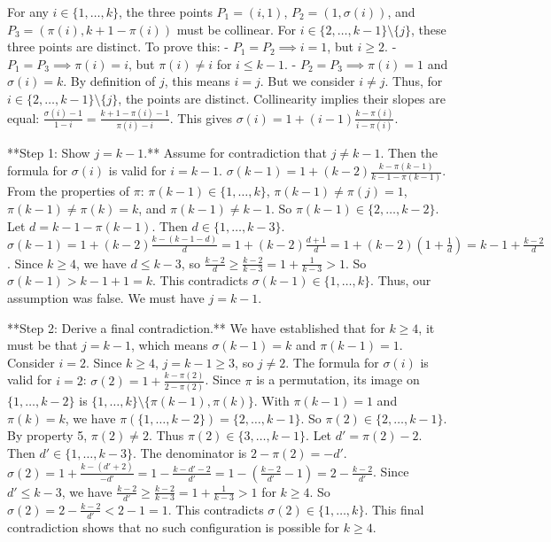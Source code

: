     For any $i \in \{1, \dots, k\}$, the three points $P_1=(i,1)$, $P_2=(1, \sigma(i))$, and $P_3=(\pi(i), k+1-\pi(i))$ must be collinear. For $i \in \{2, \dots, k-1\} \setminus \{j\}$, these three points are distinct. To prove this:
    - $P_1=P_2 \implies i=1$, but $i \ge 2$.
    - $P_1=P_3 \implies \pi(i)=i$, but $\pi(i) \ne i$ for $i \le k-1$.
    - $P_2=P_3 \implies \pi(i)=1$ and $\sigma(i)=k$. By definition of $j$, this means $i=j$. But we consider $i \ne j$.
    Thus, for $i \in \{2, \dots, k-1\} \setminus \{j\}$, the points are distinct. Collinearity implies their slopes are equal: $\frac{\sigma(i)-1}{1-i} = \frac{k+1-\pi(i)-1}{\pi(i)-i}$. This gives $\sigma(i) = 1 + (i-1)\frac{k-\pi(i)}{i-\pi(i)}$.

    **Step 1: Show $j=k-1$.**
    Assume for contradiction that $j \ne k-1$. Then the formula for $\sigma(i)$ is valid for $i=k-1$.
    $\sigma(k-1) = 1 + (k-2)\frac{k-\pi(k-1)}{k-1-\pi(k-1)}$.
    From the properties of $\pi$: $\pi(k-1) \in \{1, \dots, k\}$, $\pi(k-1) \ne \pi(j)=1$, $\pi(k-1) \ne \pi(k)=k$, and $\pi(k-1) \ne k-1$. So $\pi(k-1) \in \{2, \dots, k-2\}$.
    Let $d = k-1-\pi(k-1)$. Then $d \in \{1, \dots, k-3\}$.
    $\sigma(k-1) = 1 + (k-2)\frac{k-(k-1-d)}{d} = 1 + (k-2)\frac{d+1}{d} = 1+(k-2)(1+\frac{1}{d}) = k-1 + \frac{k-2}{d}$.
    Since $k \ge 4$, we have $d \le k-3$, so $\frac{k-2}{d} \ge \frac{k-2}{k-3} = 1+\frac{1}{k-3} > 1$.
    So $\sigma(k-1) > k-1+1=k$. This contradicts $\sigma(k-1) \in \{1, \dots, k\}$.
    Thus, our assumption was false. We must have $j=k-1$.

    **Step 2: Derive a final contradiction.**
    We have established that for $k \ge 4$, it must be that $j=k-1$, which means $\sigma(k-1)=k$ and $\pi(k-1)=1$.
    Consider $i=2$. Since $k \ge 4$, $j=k-1 \ge 3$, so $j \ne 2$. The formula for $\sigma(i)$ is valid for $i=2$:
    $\sigma(2) = 1 + \frac{k-\pi(2)}{2-\pi(2)}$.
    Since $\pi$ is a permutation, its image on $\{1, \dots, k-2\}$ is $\{1, \dots, k\} \setminus \{\pi(k-1), \pi(k)\}$. With $\pi(k-1)=1$ and $\pi(k)=k$, we have $\pi(\{1, \dots, k-2\}) = \{2, \dots, k-1\}$.
    So $\pi(2) \in \{2, \dots, k-1\}$. By property 5, $\pi(2) \ne 2$. Thus $\pi(2) \in \{3, \dots, k-1\}$.
    Let $d' = \pi(2)-2$. Then $d' \in \{1, \dots, k-3\}$.
    The denominator is $2-\pi(2) = -d'$.
    $\sigma(2) = 1 + \frac{k-(d'+2)}{-d'} = 1 - \frac{k-d'-2}{d'} = 1 - \left(\frac{k-2}{d'}-1\right) = 2 - \frac{k-2}{d'}$.
    Since $d' \le k-3$, we have $\frac{k-2}{d'} \ge \frac{k-2}{k-3} = 1+\frac{1}{k-3} > 1$ for $k \ge 4$.
    So $\sigma(2) = 2 - \frac{k-2}{d'} < 2-1=1$.
    This contradicts $\sigma(2) \in \{1, \dots, k\}$.
    This final contradiction shows that no such configuration is possible for $k \ge 4$.

